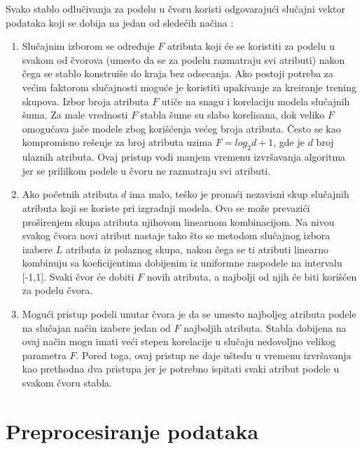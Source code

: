 \documentclass[12pt,oneside]{memoir}
\begin{document}
Svako stablo odlučivanja za podelu u čvoru koristi odgovarajući slučajni vektor podataka koji se dobija na jedan od sledećih načina \cite{mitic}:
\begin{enumerate}[1)]
\item Slučajnim izborom se određuje $F$ atributa koji će se koristiti za podelu u svakom od čvorova (umesto da se za podelu razmatraju svi atributi) nakon čega se stablo konstruiše do kraja bez odsecanja. Ako postoji potreba za većim faktorom slučajnosti moguće je koristiti upakivanje za kreiranje trening skupova. Izbor broja atributa $F$ utiče na snagu i korelaciju modela slučajnih šuma. Za male vrednosti $F$ stabla šume su slabo korelisana, dok veliko $F$ omogućava jače modele zbog korišćenja većeg broja atributa. Često se kao kompromisno rešenje za broj atributa uzima $F=log_2d+1$, gde je $d$ broj ulaznih atributa. Ovaj pristup vodi manjem vremenu izvršavanja algoritma jer se prililkom podele u čvoru ne razmatraju svi atributi. 
\item Ako početnih atributa $d$ ima malo, teško je pronaći nezavisni skup slučajnih atributa koji se koriste pri izgradnji modela. Ovo se može prevazići proširenjem skupa atributa njihovom linearnom kombinacijom. Na nivou svakog čvora novi atribut nastaje tako što se metodom slučajnog izbora izabere $L$ atributa iz polaznog skupa, nakon čega se ti atributi linearno kombinuju sa koeficijentima dobijenim iz uniformne raspodele na intervalu [-1,1]. Svaki čvor će dobiti $F$ novih atributa, a najbolji od njih će biti korišćen za podelu čvora. 
\item Mogući pristup podeli unutar čvora je da se umesto najboljeg atributa podele na slučajan način izabere jedan od $F$ najboljih atributa. Stabla dobijena na ovaj način mogu imati veći stepen korelacije u slučaju nedovoljno velikog parametra $F$. Pored toga, ovaj pristup ne daje uštedu u vremenu izvršavanja kao prethodna dva pristupa jer je potrebno ispitati svaki atribut podele u svakom čvoru stabla. 
\end{enumerate}

\section{Preprocesiranje podataka}
\end{document}
